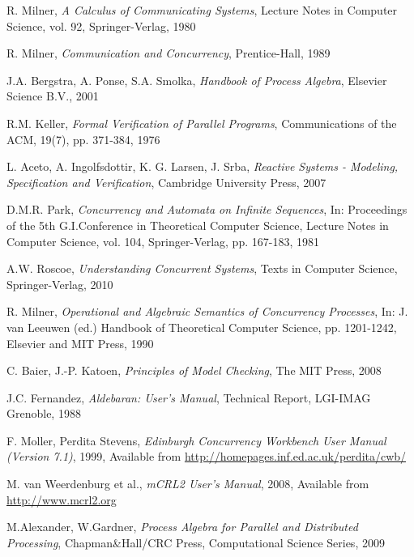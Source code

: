 
\begin{thebibliography}{[1]}

R. Milner,
\emph{A Calculus of Communicating Systems},
Lecture Notes in Computer Science, vol. 92, Springer-Verlag, 1980

R. Milner,
\emph{Communication and Concurrency},
Prentice-Hall, 1989

J.A. Bergstra, A. Ponse, S.A. Smolka, 
\emph{Handbook of Process Algebra}, 
Elsevier Science B.V., 2001

R.M. Keller,
\emph{Formal Verification of Parallel Programs},
Communications of the ACM, 19(7), pp. 371-384, 1976

L. Aceto, A. Ingolfsdottir, K. G. Larsen, J. Srba,
\emph{Reactive Systems - Modeling, Specification and Verification},
Cambridge University Press, 2007

D.M.R. Park,
\emph{Concurrency and Automata on Infinite Sequences},
In: Proceedings of the 5th G.I.Conference in Theoretical Computer Science, 
Lecture Notes in Computer Science, vol. 104, Springer-Verlag, pp. 167-183, 1981

A.W. Roscoe,
\emph{Understanding Concurrent Systems},
Texts in Computer Science, Springer-Verlag, 2010

R. Milner,
\emph{Operational and Algebraic Semantics of Concurrency Processes},
In: J. van Leeuwen (ed.) Handbook of Theoretical Computer Science, pp. 1201-1242,
Elsevier and MIT Press, 1990

C. Baier, J.-P. Katoen, 
\emph{Principles of Model Checking},
The MIT Press, 2008

J.C. Fernandez, 
\emph{Aldebaran: User's Manual},
Technical Report, LGI-IMAG Grenoble, 1988

F. Moller, Perdita Stevens,
\emph{{E}dinburgh {C}oncurrency {W}orkbench User Manual (Version 7.1)},	1999,
Available from \url{http://homepages.inf.ed.ac.uk/perdita/cwb/}

M. van Weerdenburg et al.,
\emph{mCRL2 User's Manual},	2008,
Available from \url{http://www.mcrl2.org}

M.Alexander, W.Gardner,
\emph{Process Algebra for Parallel and Distributed Processing},
Chapman\&Hall/CRC Press, Computational Science Series, 2009


\end{thebibliography}

